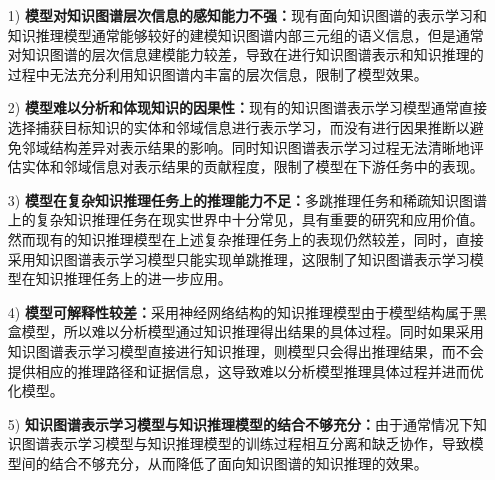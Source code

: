 \documentclass[algorithmlist, AutoFakeBold, AutoFakeSlant, figurelist, tablelist, nomlist, engineering]{seuthesix}
\begin{document}
\begin{itemize}
  \item [1)]\textbf{模型对知识图谱层次信息的感知能力不强：}现有面向知识图谱的表示学习和知识推理模型通常能够较好的建模知识图谱内部三元组的语义信息，但是通常对知识图谱的层次信息建模能力较差，导致在进行知识图谱表示和知识推理的过程中无法充分利用知识图谱内丰富的层次信息，限制了模型效果。
  \item [2)]\textbf{模型难以分析和体现知识的因果性：}现有的知识图谱表示学习模型通常直接选择捕获目标知识的实体和邻域信息进行表示学习，而没有进行因果推断以避免邻域结构差异对表示结果的影响。同时知识图谱表示学习过程无法清晰地评估实体和邻域信息对表示结果的贡献程度，限制了模型在下游任务中的表现。
  \item [3)]\textbf{模型在复杂知识推理任务上的推理能力不足：}多跳推理任务和稀疏知识图谱上的复杂知识推理任务在现实世界中十分常见，具有重要的研究和应用价值。然而现有的知识推理模型在上述复杂推理任务上的表现仍然较差，同时，直接采用知识图谱表示学习模型只能实现单跳推理，这限制了知识图谱表示学习模型在知识推理任务上的进一步应用。
  \item [4)]\textbf{模型可解释性较差：}采用神经网络结构的知识推理模型由于模型结构属于黑盒模型，所以难以分析模型通过知识推理得出结果的具体过程。同时如果采用知识图谱表示学习模型直接进行知识推理，则模型只会得出推理结果，而不会提供相应的推理路径和证据信息，这导致难以分析模型推理具体过程并进而优化模型。
  \item [5)]\textbf{知识图谱表示学习模型与知识推理模型的结合不够充分：}由于通常情况下知识图谱表示学习模型与知识推理模型的训练过程相互分离和缺乏协作，导致模型间的结合不够充分，从而降低了面向知识图谱的知识推理的效果。
\end{itemize}
\end{document}
